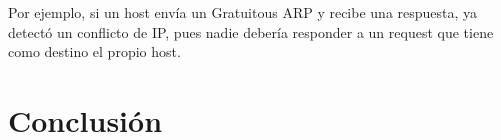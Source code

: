 \documentclass[a4paper, 10pt, twoside]{article}
\begin{document}
Por ejemplo, si un host envía un Gratuitous ARP y recibe una respuesta, ya detectó un conflicto de IP, pues nadie debería responder a un request que tiene como destino el propio host.





\section{Conclusión}
\end{document}
